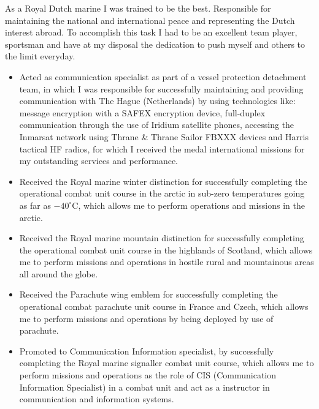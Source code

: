 \SmallSep


{
  As a Royal Dutch marine I was trained to be the best. Responsible for
  maintaining the national and international peace and representing the Dutch
  interest abroad. To accomplish this task I had to be an excellent team
  player, sportsman and have at my disposal the dedication to push myself and
  others to the limit everyday.

  \SmallSep

  \begin{itemize}
    \item Acted as communication specialist as part of a vessel protection
      detachment team, in which I was responsible for successfully maintaining
      and providing communication with The Hague (Netherlands) by using
      technologies like: message encryption with a SAFEX encryption device,
      full-duplex communication through the use of Iridium satellite phones,
      accessing the Inmarsat network using Thrane \& Thrane Sailor FBXXX
      devices and Harris tactical HF radios, for which I received the medal
      international missions for my outstanding services and performance.
    \item Received the Royal marine winter distinction for successfully
      completing the operational combat unit course in the arctic in sub-zero
      temperatures going as far as $-40^\circ$C, which allows me to perform
      operations and missions in the arctic.
    \item Received the Royal marine mountain distinction for successfully
      completing the operational combat unit course in the highlands of
      Scotland, which allows me to perform missions and operations in hostile
      rural and mountainous areas all around the globe.
    \item Received the Parachute wing emblem for successfully completing the
      operational combat parachute unit course in France and Czech, which
      allows me to perform missions and operations by being deployed by use
      of parachute.
    \item Promoted to Communication Information specialist, by successfully
      completing the Royal marine signaller combat unit course, which allows me
      to perform missions and operations as the role of CIS (Communication
      Information Specialist) in a combat unit and act as a instructor in
      communication and information systems.
  \end{itemize}
}

